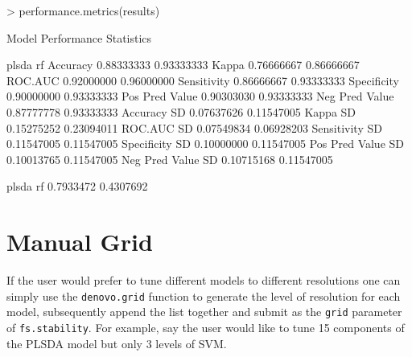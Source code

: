 \documentclass[12pt]{article}
\renewenvironment{Schunk}{\vspace{\topsep}}{\vspace{\topsep}}
\begin{document}
\begin{Schunk}
\begin{Sinput}
> performance.metrics(results)
\end{Sinput}
\begin{Soutput}
Model Performance Statistics

                       plsda         rf
Accuracy          0.88333333 0.93333333
Kappa             0.76666667 0.86666667
ROC.AUC           0.92000000 0.96000000
Sensitivity       0.86666667 0.93333333
Specificity       0.90000000 0.93333333
Pos Pred Value    0.90303030 0.93333333
Neg Pred Value    0.87777778 0.93333333
Accuracy SD       0.07637626 0.11547005
Kappa SD          0.15275252 0.23094011
ROC.AUC SD        0.07549834 0.06928203
Sensitivity SD    0.11547005 0.11547005
Specificity SD    0.10000000 0.11547005
Pos Pred Value SD 0.10013765 0.11547005
Neg Pred Value SD 0.10715168 0.11547005
\end{Soutput}
\begin{Soutput}
    plsda        rf 
0.7933472 0.4307692 
\end{Soutput}
\end{Schunk}


\maketitle
\section{Manual Grid}
If the user would prefer to tune different models to different resolutions one can simply use the {\tt denovo.grid} function to generate the level of resolution for each model, subsequently append the list together and submit as the {\tt grid} parameter of {\tt fs.stability}. For example, say the user would like to tune 15 components of the PLSDA model but only 3 levels of SVM.
\end{document}
